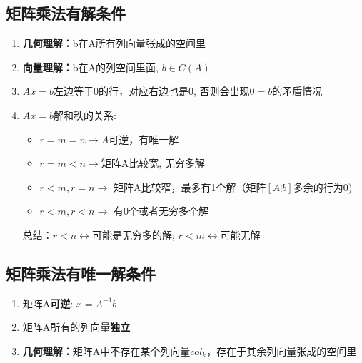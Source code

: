 \documentclass{book}
\begin{document}
\subsection{矩阵乘法有解条件}

\begin{enumerate}
  \item \textbf{几何理解：}b在A所有列向量张成的空间里
  \item \textbf{向量理解：}b在A的列空间里面, $b \in C(A)$
  \item $Ax=b$左边等于0的行，对应右边也是0, 否则会出现$0=b$的矛盾情况
  \item $Ax=b$解和秩的关系: 
    \begin{itemize}
      \item $r=m=n \rightarrow A$可逆，有唯一解
      \item $r=m<n \rightarrow$矩阵A比较宽, 无穷多解
      \item $r<m, r=n \rightarrow$ 矩阵A比较窄，最多有1个解（矩阵$\left[A \vdots b\right]$多余的行为0)
      \item $r<m ,r<n \rightarrow$ 有0个或者无穷多个解
    \end{itemize}
    总结：$r<n \leftrightarrow $可能是无穷多的解; $r<m\leftrightarrow$可能无解
\end{enumerate}

\subsection{矩阵乘法有唯一解条件}
\begin{enumerate}
  \item 矩阵A\textbf{可逆}: $x=A^{-1}b$ 
  \item 矩阵A所有的列向量\textbf{独立}
  \item \textbf{几何理解：}矩阵A中不存在某个列向量$col_k$，存在于其余列向量张成的空间里
\end{enumerate}
\end{document}
